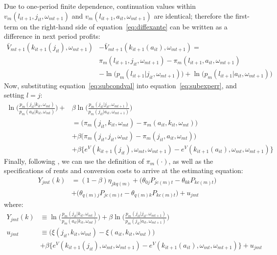 \documentclass[11pt]{article}
\begin{document}
Due to one-period finite dependence, continuation values within $v_m(l_{it+1},j_{it},\omega_{mt+1})$ and $v_m(l_{it+1},a_{it},\omega_{mt+1})$ are identical; therefore the first-term on the right-hand side of equation~\ref{eq:diffexante} can be written as a difference in next period profits:
\begin{align}  \label{eq:subcondval}
\bar{V}_{mt+1}(k_{it+1}(j_{it}),\omega_{mt+1})& -  \bar{V}_{mt+1}(k_{it+1}(a_{it}),\omega_{mt+1}) = \\ \nonumber
& \pi_m(l_{it+1},j_{it},\omega_{mt+1}) - \pi_m(l_{it+1},a_{it},\omega_{mt+1})\\ 
& - \ln\big(p_m(l_{it+1}|j_{it},\omega_{mt+1})\big) + \ln\big(p_m(l_{it+1}|a_{it},\omega_{mt+1})\big) \nonumber
\end{align}
Now, substituting equation~\ref{eq:subcondval} into equation~\ref{eq:subexperr}, and setting $l = j$:
\begin{align} 
\ln\bigg(\frac{p_m(j_{it}|k_{it},\omega_{mt})}{p_m(a_{it}|k_{it},\omega_{mt})}\bigg) + & \beta\ln\bigg(\frac{p_m(j_{it}|j_{it},\omega_{mt+1})}{p_m(j_{it}|a_{it},\omega_{mt+1})}\bigg) \\
 &=\big(\pi_m(j_{it},k_{it},\omega_{mt}) - \pi_m(a_{it},k_{it},\omega_{mt})\big)  \nonumber \\
	& + \beta \big(\pi_m(j_{it},j_{it},\omega_{mt}) - \pi_m(j_{it},a_{it},\omega_{mt})\big) \nonumber \\ 
	& + \beta \Big\{e^V(k_{it+1}(j_{it}),\omega_{mt},\omega_{mt+1}) -  e^V(k_{it+1}(a_{it}),\omega_{mt},\omega_{mt+1})\Big\} \nonumber
\end{align}
Finally, following \citet{araujo2021}, we can use the definition of $\pi_m(\cdot)$, as well as the specifications of rents and conversion costs to arrive at the estimating equation:
\begin{align}
Y_{jmt}(k) &= (1 - \beta) \eta_{jkq(m)} + \big(\theta_{0j}P_{jc(m)t} - \theta_{0k}P_{kc(m)t}\big) \\
&+ \big(\theta_{q(m)j}P_{jc(m)t} - \theta_{q(m)k}P_{kc(m)t}\big) + u_{jmt} \nonumber
\end{align}
where:
\begin{align}
Y_{jmt}(k) &\equiv \ln\bigg(\frac{p_m(j_{it}|k_{it},\omega_{mt})}{p_m(a_{it}|k_{it},\omega_{mt})}\bigg) + \beta\ln\bigg(\frac{p_m(j_{it}|j_{it},\omega_{mt+1})}{p_m(j_{it}|a_{it},\omega_{mt+1})}\bigg) \\
u_{jmt} &\equiv \Big(\xi(j_{it},k_{it},\omega_{mt}) - \xi(a_{it},k_{it},\omega_{mt})\Big) \\
& + \beta \Big\{e^V(k_{it+1}(j_{it}),\omega_{mt},\omega_{mt+1}) -  e^V(k_{it+1}(a_{it}),\omega_{mt},\omega_{mt+1})\Big\} + u_{jmt} \nonumber 
\end{align}
\end{document}
